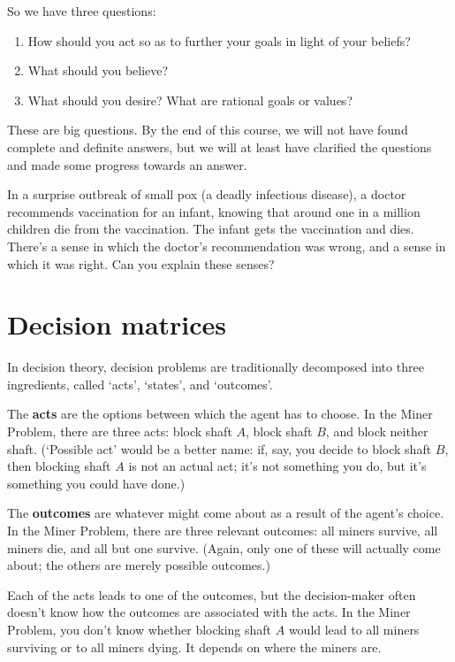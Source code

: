 So we have three questions:
\begin{enumerate}
  \itemsep0em 
\item How should you act so as to further your goals in light of
  your beliefs?
\item What should you believe?
\item What should you desire? What are rational goals or values?
\end{enumerate}
These are big questions. By the end of this course, we will not have
found complete and definite answers, but we will at least have
clarified the questions and made some progress towards an answer.

\begin{exercise}{2}
  In a surprise outbreak of small pox (a deadly infectious disease), a doctor
  recommends vaccination for an infant, knowing that around one in a million
  children die from the vaccination. The infant gets the vaccination and dies.
  There's a sense in which the doctor's recommendation was wrong, and a sense in
  which it was right. Can you explain these senses?
\end{exercise}


\section{Decision matrices}\label{sec:decision-matrices}

In decision theory, decision problems are traditionally decomposed into three
ingredients, called `acts', `states', and `outcomes'.

The \textbf{acts} are the options between which the agent has to choose. In the
Miner Problem, there are three acts: block shaft $A$, block shaft $B$, and
block neither shaft. (`Possible act' would be a better name: if, say, you
decide to block shaft $B$, then blocking shaft $A$ is not an actual act; it's
not something you do, but it's something you could have done.)

The \textbf{outcomes} are whatever might come about as a result of the agent's
choice. In the Miner Problem, there are three relevant outcomes: all miners
survive, all miners die, and all but one survive. (Again, only one of these will
actually come about; the others are merely possible outcomes.)

Each of the acts leads to one of the outcomes, but the decision-maker often
doesn't know how the outcomes are associated with the acts. In the Miner
Problem, you don't know whether blocking shaft $A$ would lead to all miners
surviving or to all miners dying. It depends on where the miners are.

